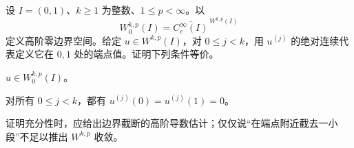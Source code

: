 \begin{optionalexercise}\label{b1:ex:23-higher-zero-endpoints}
设 \(I=(0,1)\)、\(k\ge1\) 为整数、\(1\le p<\infty\)。以
\[
 W_0^{k,p}(I)=\overline{C_c^\infty(I)}^{\,W^{k,p}(I)}
\]
定义高阶零边界空间。给定 \(u\in W^{k,p}(I)\)，对 \(0\le j<k\)，用
\(u^{(j)}\) 的绝对连续代表定义它在 \(0,1\) 处的端点值。证明下列条件等价。
\begin{equivalences}
 \item\label{b1:item:23-higher-zero-closure}
 \(u\in W_0^{k,p}(I)\)。
 \item\label{b1:item:23-higher-zero-jets}
 对所有 \(0\le j<k\)，都有 \(u^{(j)}(0)=u^{(j)}(1)=0\)。
\end{equivalences}
证明充分性时，应给出边界截断的高阶导数估计；仅仅说“在端点附近截去一小段”不足以推出 \(W^{k,p}\) 收敛。
\end{optionalexercise}
